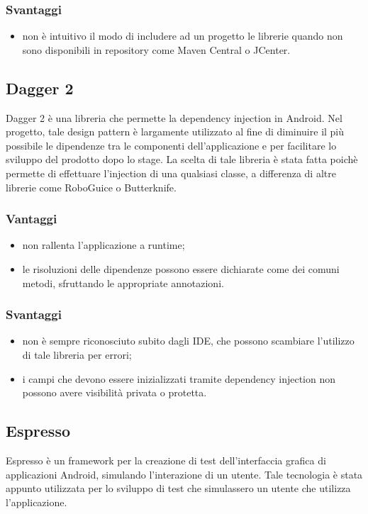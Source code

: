 \documentclass[../Tesi.tex]{subfiles}
\begin{document}
		\subsubsection{Svantaggi}
			\begin{itemize}
				\item non è intuitivo il modo di includere ad un progetto le librerie quando non sono disponibili in repository come Maven Central o JCenter.
			\end{itemize}

	\subsection{Dagger 2}
		Dagger 2 è una libreria che permette la dependency injection in Android. Nel progetto, tale design pattern è largamente utilizzato al fine di diminuire il più possibile le dipendenze tra le componenti dell'applicazione e per facilitare lo sviluppo del prodotto dopo lo stage. La scelta di tale libreria è stata fatta poichè permette di effettuare l'injection di una qualsiasi classe, a differenza di altre librerie come RoboGuice o Butterknife.
		\subsubsection{Vantaggi}
			\begin{itemize}
				\item non rallenta l'applicazione a runtime;
				\item le risoluzioni delle dipendenze possono essere dichiarate come dei comuni metodi, sfruttando le appropriate annotazioni.
			\end{itemize}
		\subsubsection{Svantaggi}
			\begin{itemize}
				\item non è sempre riconosciuto subito dagli IDE, che possono scambiare l'utilizzo di tale libreria per errori;
				\item i campi che devono essere inizializzati tramite dependency injection non possono avere visibilità privata o protetta.
			\end{itemize}

	\subsection{Espresso}
		Espresso è un framework per la creazione di test dell'interfaccia grafica di applicazioni Android, simulando l'interazione di un utente. Tale tecnologia è stata appunto utilizzata per lo sviluppo di test che simulassero un utente che utilizza l'applicazione.
\end{document}
